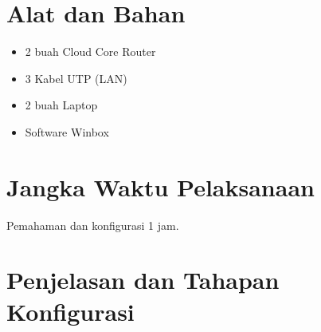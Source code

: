 \section{Alat dan Bahan}
\begin{itemize}[label=$\bullet$, itemsep=-1pt, leftmargin=*]
	\item 2 buah Cloud Core Router
	\item 3 Kabel UTP (LAN)
	\item 2 buah Laptop
	\item Software Winbox
\end{itemize}

\section{Jangka Waktu Pelaksanaan}
Pemahaman dan konfigurasi 1 jam.

\section{Penjelasan dan Tahapan Konfigurasi}

